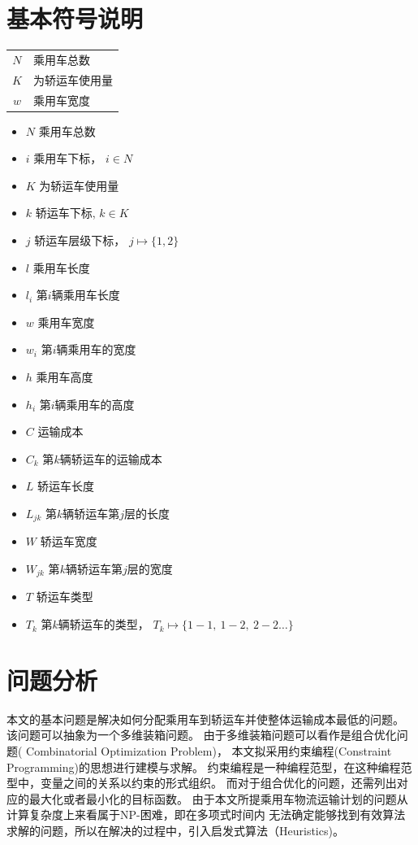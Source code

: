 \documentclass[UTF8]{ctexart}
\begin{document}
\section{基本符号说明}
\begin{table}[h!]
	\begin{tabular}{c || l}

	$N$  & 乘用车总数 \\
	$K$ & 为轿运车使用量 \\
	$w$ &乘用车宽度
	
	\end{tabular}
	
\end{table}
	\begin{itemize}
		\item $N$ 乘用车总数
		\item $i$ 乘用车下标， $i \in N$
		\item $K$ 为轿运车使用量
		\item $k$ 轿运车下标,  $k \in K$
		\item $j$ 轿运车层级下标， $j \mapsto \{1,2\}$
		\item $l$ 乘用车长度
		\item $l_i$ 第$i$辆乘用车长度
		\item $w$ 乘用车宽度
		\item $w_i$ 第$i$辆乘用车的宽度
		\item $h$ 乘用车高度
		\item $h_i$ 第$i$辆乘用车的高度
		\item $C$ 运输成本
		\item $C_k$ 第$k$辆轿运车的运输成本
		\item $L$ 轿运车长度
		\item $L_{jk}$ 第$k$辆轿运车第$j$层的长度
		\item $W$ 轿运车宽度
		\item $W_{jk}$ 第$k$辆轿运车第$j$层的宽度
		\item $T$ 轿运车类型
		\item $T_k$ 第$k$辆轿运车的类型， $T_k \mapsto \{1-1, ~1-2, ~2-2 \dots \}$
		
	\end{itemize}


\section{问题分析}
本文的基本问题是解决如何分配乘用车到轿运车并使整体运输成本最低的问题。
该问题可以抽象为一个多维装箱问题。
由于多维装箱问题可以看作是组合优化问题( Combinatorial Optimization Problem)，
本文拟采用约束编程(Constraint Programming)的思想进行建模与求解。
约束编程是一种编程范型，在这种编程范型中，变量之间的关系以约束的形式组织。
而对于组合优化的问题，还需列出对应的最大化或者最小化的目标函数。
由于本文所提乘用车物流运输计划的问题从计算复杂度上来看属于NP-困难，即在多项式时间内
无法确定能够找到有效算法求解的问题，所以在解决的过程中，引入启发式算法（Heuristics)。
\end{document}
